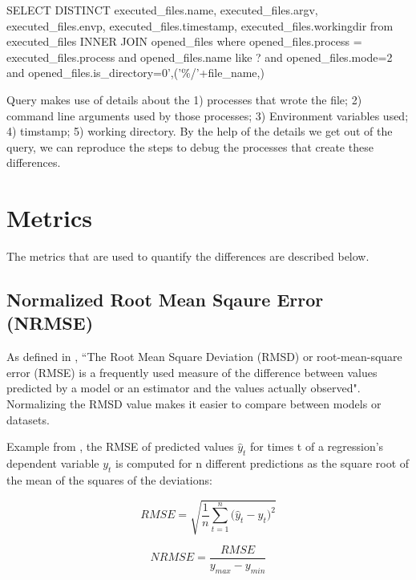 \begin{tcolorbox}[colback=black!5!white,colframe=black!75!black]
SELECT DISTINCT executed\_files.name, executed\_files.argv, executed\_files.envp, executed\_files.timestamp, executed\_files.workingdir from executed\_files INNER JOIN opened\_files where opened\_files.process = executed\_files.process and opened\_files.name like ? and opened\_files.mode=2 and opened\_files.is\_directory=0',('\%/'+file\_name,)
\end{tcolorbox}
\label{fig:provenance-query}

Query makes use of details about the 1) processes that wrote the file; 2) command line arguments used by those processes; 3) Environment variables used; 4) timstamp; 5) working directory. By the help of the details we get out of the query, we can reproduce the steps to debug the processes that create these differences.

\section{Metrics} \label{sec:num1}
The metrics that are used to quantify the differences are described below.

\subsection{Normalized Root Mean Sqaure Error (NRMSE)}
As defined in \cite{khosrow2017handbook}, ``The Root Mean Square Deviation (RMSD) or root-mean-square error (RMSE) is a frequently used measure of the difference between values predicted by a model or an estimator and the values actually observed". Normalizing the RMSD value makes it easier to compare between models or datasets.

Example from \cite{NRMSE}, the RMSE of predicted values ${\displaystyle {\hat {y}}_{t}}$  for times t of a regression's dependent variable ${\displaystyle y_{t}}$ is computed for n different predictions as the square root of the mean of the squares of the deviations:\\

\begin{center}
  \begin{equation}
     RMSE = {\sqrt {\frac{1} {n}{\sum\limits_{t = 1}^n {(\hat{y}_{t} - {y}_{t} } })^{2} } }
  \end{equation}
\end{center}

\begin{center}
  \begin{equation}
    NRMSE = {\frac{RMSE} {y_{max} - y_{min}}}
  \end{equation}
\end{center}

